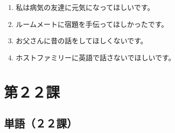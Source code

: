 \documentclass[notoc,notitlepage]{tufte-book}
\begin{document}
\begin{eg}
  \begin{enumerate}
    \item 私は病気の友達に元気になってほしいです。
    \item ルームメートに宿題を手伝ってほしかったです。
    \item お父さんに昔の話をしてほしくないです。
    \item ホストファミリーに英語で話さないでほしいです。
  \end{enumerate}
\end{eg}



\chapter{第２２課}%
\label{chp:dai_22_ka}

\section{単語（２２課）}%
\label{sec:tango_c22}
\end{document}
